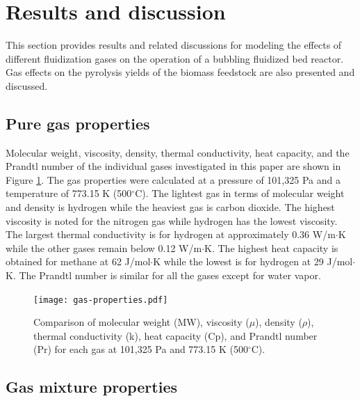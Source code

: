
\section{Results and discussion}

This section provides results and related discussions for modeling the effects of different fluidization gases on the operation of a bubbling fluidized bed reactor. Gas effects on the pyrolysis yields of the biomass feedstock are also presented and discussed.


\subsection{Pure gas properties}

Molecular weight, viscosity, density, thermal conductivity, heat capacity, and the Prandtl number of the individual gases investigated in this paper are shown in Figure \ref{fig:gas-properties}. The gas properties were calculated at a pressure of 101,325 Pa and a temperature of 773.15 K (500$^\circ$C). The lightest gas in terms of molecular weight and density is hydrogen while the heaviest gas is carbon dioxide. The highest viscosity is noted for the nitrogen gas while hydrogen has the lowest viscosity. The largest thermal conductivity is for hydrogen at approximately 0.36 W/m$\cdot$K while the other gases remain below 0.12 W/m$\cdot$K. The highest heat capacity is obtained for methane at 62 J/mol$\cdot$K while the lowest is for hydrogen at 29 J/mol$\cdot$K. The Prandtl number is similar for all the gases except for water vapor.

\begin{figure}[H]
    \centering
    \texttt{[image: gas-properties.pdf]}
    \caption{Comparison of molecular weight (MW), viscosity ($\mu$), density ($\rho$), thermal conductivity (k), heat capacity (Cp), and Prandtl number (Pr) for each gas at 101,325 Pa and 773.15 K (500$^\circ$C).}
    \label{fig:gas-properties}
\end{figure}


\subsection{Gas mixture properties}

